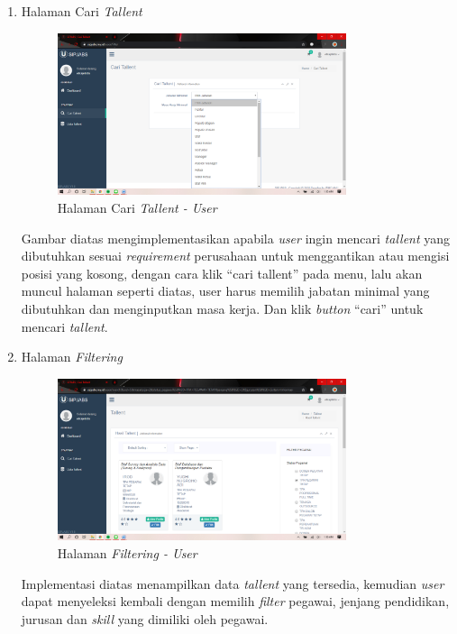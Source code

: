 \begin{enumerate}
	\newpage
	\item Halaman Cari \textit{Tallent}
	\begin{figure}
		\centering
		\includegraphics[width=0.8\textwidth]
		{pics/user/implementasi/caritallent.png}
		\caption{Halaman Cari \textit{Tallent - User}}
		\label{fig:CC10}
	\end{figure}
	
	Gambar diatas mengimplementasikan apabila \textit{user} ingin mencari \textit{tallent} yang dibutuhkan sesuai \textit{requirement} perusahaan untuk menggantikan atau mengisi posisi yang kosong, dengan cara klik “cari tallent” pada menu, lalu akan muncul halaman seperti diatas, user harus memilih jabatan minimal yang dibutuhkan dan menginputkan masa kerja. Dan klik \textit{button} “cari” untuk mencari \textit{tallent}.
	
	\item Halaman \textit{Filtering}
	\begin{figure}
		\centering
		\includegraphics[width=0.8\textwidth]
		{pics/user/implementasi/hasiltallent.png}
		\caption{Halaman \textit{Filtering - User}}
		\label{fig:CC10}
	\end{figure}
	
	Implementasi diatas menampilkan data \textit{tallent} yang tersedia, kemudian \textit{user} dapat menyeleksi kembali dengan memilih \textit{filter} pegawai, jenjang pendidikan, jurusan dan \textit{skill} yang dimiliki oleh pegawai.
	

\end{enumerate}
